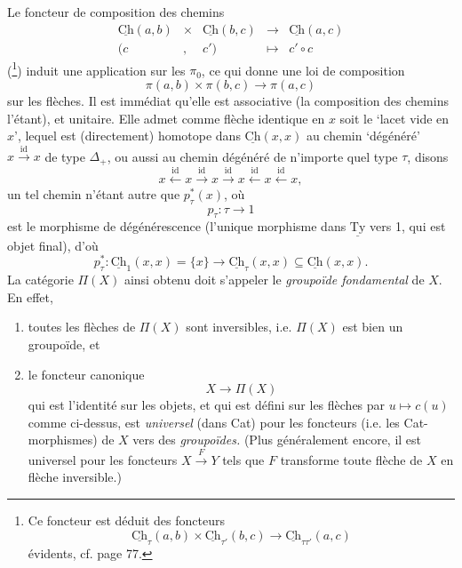 \documentclass[11pt]{article}
\newcommand{\printedpage}[1]{\marginpar{\footnotesize p.~#1}}
\newcommand{\msp}[1]{\marginpar{\vspace*{10pt}\footnotesize [#1]}}
\newcommand{\Ch}{\underline{\mathrm{Ch}}}
\newcommand{\Ty}{\underline{\mathrm{Ty}}}
\begin{document}
\printedpage{41}
Le foncteur de composition des chemins
\[
\begin{array}{ccccc}
\Ch(a,b) & \times & \Ch(b,c) & \longrightarrow & \Ch(a,c)\\
(c & , & c') & \longmapsto & c' \circ c
\end{array}
\]
 (\footnote[17]{Ce foncteur est déduit des foncteurs
\[
\Ch_\tau(a,b) \times \Ch_{\tau'}(b,c) \longrightarrow \Ch_{\tau\tau'}(a,c)
\]
évidents, cf. page 77.}) induit une application sur les $\pi_0$, ce qui donne une loi de composition
\[
\pi(a,b) \times \pi(b,c) \longrightarrow \pi(a,c)
\]
sur les flèches. Il est immédiat qu'elle est associative (la composition des chemins l'étant), et unitaire. Elle admet comme flèche identique en $x$ soit le `lacet vide en $x$', lequel est (directement) homotope dans $\Ch(x,x)$ au chemin `dégénéré' $x \xrightarrow{\mathrm{id}} x$
\msp{page 62}
de type $\Delta_+$, ou aussi au chemin dégénéré de n'importe quel type $\tau$, disons
\[
x \xleftarrow{\mathrm{id}} x \xrightarrow{\mathrm{id}} x \xrightarrow{\mathrm{id}} x \xleftarrow{\mathrm{id}} x \xleftarrow{\mathrm{id}} x,
\]
un tel chemin n'étant autre que $p_\tau^*(x)$, où
\[
p_\tau : \tau \longrightarrow 1
\]
est le morphisme de dégénérescence (l'unique morphisme dans $\Ty$ vers 1, qui est objet final), d'où
\[
p_\tau^* : \Ch_1(x,x) = \{x\} \longrightarrow \Ch_\tau(x,x) \subseteq \Ch(x,x).
\]
La catégorie $\Pi(X)$ ainsi obtenu doit s'appeler le \textit{groupoïde fondamental} de $X$. En effet, %

\begin{enumerate}[label=\alph*)]
\item toutes les flèches de $\Pi(X)$ sont inversibles, i.e. $\Pi(X)$ est bien un groupoïde, et
\item le foncteur canonique
\[
X \longrightarrow \Pi(X)
\]
qui est l'identité sur les objets, et qui est défini sur les flèches par $u \longmapsto c(u)$ comme ci-dessus, est \textit{universel} (dans Cat) pour les foncteurs (i.e. les Cat-morphismes) de $X$ vers des \textit{groupoïdes.} (Plus généralement encore, il est universel pour les foncteurs $X \xrightarrow{F} Y$ tels que $F$ transforme toute flèche de $X$ en flèche inversible.)
\end{enumerate}
\end{document}

